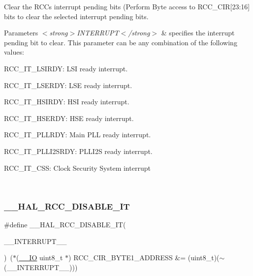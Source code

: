 Clear the R\+CC\textquotesingle{}s interrupt pending bits (Perform Byte access to R\+C\+C\+\_\+\+C\+IR\mbox{[}23\+:16\mbox{]} bits to clear the selected interrupt pending bits. 


\begin{DoxyParams}{Parameters}
{\em $<$strong$>$\+I\+N\+T\+E\+R\+R\+U\+P\+T$<$/strong$>$} & specifies the interrupt pending bit to clear. This parameter can be any combination of the following values\+: \begin{DoxyItemize}
\item R\+C\+C\+\_\+\+I\+T\+\_\+\+L\+S\+I\+R\+DY\+: L\+SI ready interrupt. \item R\+C\+C\+\_\+\+I\+T\+\_\+\+L\+S\+E\+R\+DY\+: L\+SE ready interrupt. \item R\+C\+C\+\_\+\+I\+T\+\_\+\+H\+S\+I\+R\+DY\+: H\+SI ready interrupt. \item R\+C\+C\+\_\+\+I\+T\+\_\+\+H\+S\+E\+R\+DY\+: H\+SE ready interrupt. \item R\+C\+C\+\_\+\+I\+T\+\_\+\+P\+L\+L\+R\+DY\+: Main P\+LL ready interrupt. \item R\+C\+C\+\_\+\+I\+T\+\_\+\+P\+L\+L\+I2\+S\+R\+DY\+: P\+L\+L\+I2S ready interrupt. \item R\+C\+C\+\_\+\+I\+T\+\_\+\+C\+SS\+: Clock Security System interrupt \end{DoxyItemize}
\\
\hline
\end{DoxyParams}
\mbox{\label{group___r_c_c___flags___interrupts___management_gafc4df8cd4df0a529d11f18bf1f7e9f50}} 
\subsubsection{\texorpdfstring{\+\_\+\+\_\+\+H\+A\+L\+\_\+\+R\+C\+C\+\_\+\+D\+I\+S\+A\+B\+L\+E\+\_\+\+IT}{\_\_HAL\_RCC\_DISABLE\_IT}}
{\footnotesize\ttfamily \#define \+\_\+\+\_\+\+H\+A\+L\+\_\+\+R\+C\+C\+\_\+\+D\+I\+S\+A\+B\+L\+E\+\_\+\+IT(\begin{DoxyParamCaption}\item[{}]{\+\_\+\+\_\+\+I\+N\+T\+E\+R\+R\+U\+P\+T\+\_\+\+\_\+ }\end{DoxyParamCaption})~($\ast$(\hyperlink{core__sc300_8h_aec43007d9998a0a0e01faede4133d6be}{\+\_\+\+\_\+\+IO} uint8\+\_\+t $\ast$) R\+C\+C\+\_\+\+C\+I\+R\+\_\+\+B\+Y\+T\+E1\+\_\+\+A\+D\+D\+R\+E\+SS \&= (uint8\+\_\+t)($\sim$(\+\_\+\+\_\+\+I\+N\+T\+E\+R\+R\+U\+P\+T\+\_\+\+\_\+)))}



